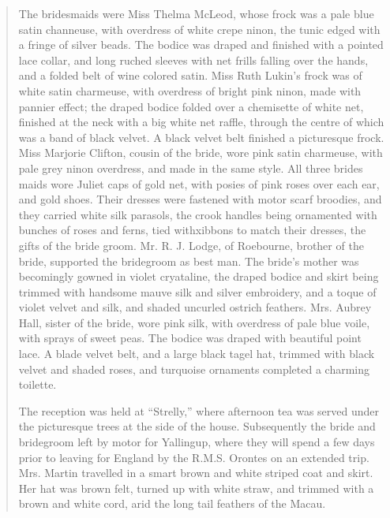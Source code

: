 \begin{quotation}
The bridesmaids were Miss Thelma McLeod, whose frock was a pale blue satin channeuse, with overdress of white crepe ninon, the tunic edged with a fringe of silver beads. The bodice was draped and finished with a pointed lace collar, and long ruched sleeves with net frills falling over the hands, and a folded belt of wine colored satin. Miss Ruth Lukin's frock was of white satin charmeuse, with overdress of bright pink ninon, made with pannier effect; the draped bodice folded over a chemisette of white net, finished at the neck with a big white net raffle, through the centre of which was a band of black velvet. A black velvet belt finished a picturesque frock. Miss Marjorie Clifton, cousin of the bride, wore pink satin charmeuse, with pale grey ninon overdress, and made in the same style. All three brides maids wore Juliet caps of gold net, with posies of pink roses over each ear, and gold shoes. Their dresses were fastened with motor scarf broodies, and they carried white silk parasols, the crook handles being ornamented with bunches of roses and ferns, tied withxibbons to match their dresses, the gifts of the bride groom. Mr. R. J. Lodge, of Roebourne, brother of the bride, supported the bridegroom as best man. The bride's mother was becomingly gowned in violet cryataline, the draped bodice and skirt being trimmed with handsome mauve silk and silver embroidery, and a toque of violet velvet and silk, and shaded uncurled ostrich feathers. Mrs. Aubrey Hall, sister of the bride, wore pink silk, with overdress of pale blue voile, with sprays of sweet peas. The bodice was draped with beautiful point lace. A blade velvet belt, and a large black tagel hat, trimmed with black velvet and shaded roses, and turquoise ornaments completed a charming toilette.

The reception was held at ``Strelly,'' where afternoon tea was served under the picturesque trees at the side of the house. Subsequently the bride and bridegroom left by motor for Yallingup, where they will spend a few days prior to leaving for England by the R.M.S. Orontes on an extended trip. Mrs. Martin travelled in a smart brown and white striped coat and skirt. Her hat was brown felt, turned up with white straw, and trimmed with a brown and white cord, arid the long tail feathers of the Macau.
\end{quotation}
